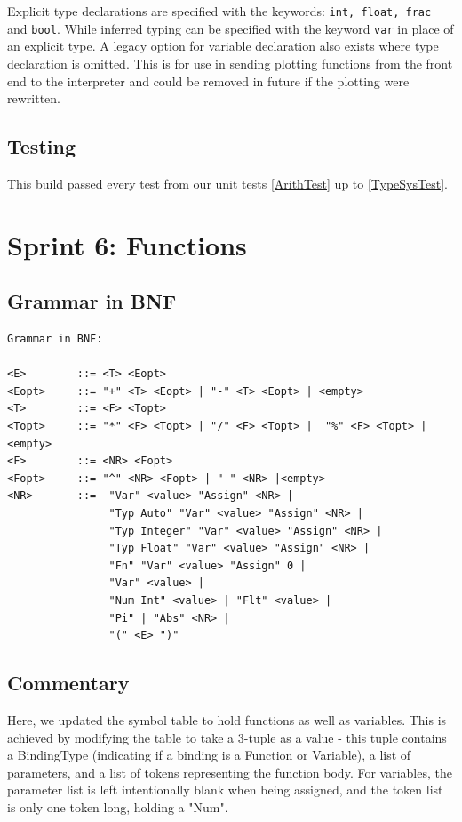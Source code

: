 \documentclass[a4paper, oneside, 11pt]{report}
\begin{document}
    Explicit type declarations are specified with the keywords: \verb|int, float, frac| and \verb|bool|.
    While inferred typing can be specified with the keyword \verb|var| in place of an explicit type.
    A legacy option for variable declaration also exists where type declaration is omitted.
    This is for use in sending plotting functions from the front end to the interpreter and could be removed in future if the plotting were rewritten.

    \subsection{Testing}

    This build passed every test from our unit tests \ref{ArithTest} up to \ref{TypeSysTest}.


    \clearpage
    \section{Sprint 6: Functions}
    \subsection{Grammar in BNF}
    \begin{verbatim}
Grammar in BNF:

<E>        ::= <T> <Eopt>
<Eopt>     ::= "+" <T> <Eopt> | "-" <T> <Eopt> | <empty>
<T>        ::= <F> <Topt>
<Topt>     ::= "*" <F> <Topt> | "/" <F> <Topt> |  "%" <F> <Topt> |<empty>
<F>        ::= <NR> <Fopt>
<Fopt>     ::= "^" <NR> <Fopt> | "-" <NR> |<empty>
<NR>       ::=  "Var" <value> "Assign" <NR> |
                "Typ Auto" "Var" <value> "Assign" <NR> |
                "Typ Integer" "Var" <value> "Assign" <NR> |
                "Typ Float" "Var" <value> "Assign" <NR> |
                "Fn" "Var" <value> "Assign" 0 |
                "Var" <value> |
                "Num Int" <value> | "Flt" <value> |
                "Pi" | "Abs" <NR> |
                "(" <E> ")"
    \end{verbatim}

    \subsection{Commentary}
    Here, we updated the symbol table to hold functions as well as variables. This is achieved by modifying the table to take a 3-tuple as a value - this tuple contains a BindingType (indicating if a binding is a Function or Variable), a list of parameters, and a list of tokens representing the function body. For variables, the parameter list is left intentionally blank when being assigned, and the token list is only one token long, holding a "Num".
\end{document}
